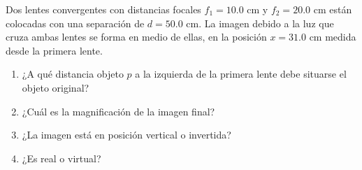 \item Dos lentes convergentes con distancias focales $f_1 = 10.0\text{ cm}$ y $f_2 = 20.0\text{ cm}$ están colocadas con una separación de $d = 50.0\text{ cm}$. La imagen debido a la luz que cruza ambas lentes se forma en medio de ellas, en la posición $x = 31.0\text{ cm}$ medida desde la primera lente.
\begin{enumerate}
    \item ¿A qué distancia objeto $p$ a la izquierda de la primera lente debe situarse el objeto original?
    \item ¿Cuál es la magnificación de la imagen final?
    \item ¿La imagen está en posición vertical o invertida?
    \item ¿Es real o virtual?
\end{enumerate}